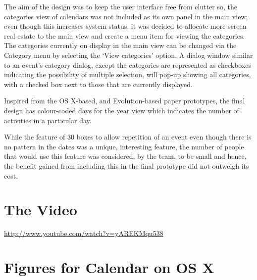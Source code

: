 \documentclass{article}
\begin{document}
The aim of the design was to keep the user interface free from clutter
so, the categories view of calendars was not included as its own panel
in the main view; even though this increases system status, it was
decided to allocate more screen real estate to the main view and create
a menu item for viewing the categories. The categories currently on
display in the main view can be changed via the Category menu by
selecting the `View categories' option. A dialog window similar to
an event's category dialog, except the categories are represented as
checkboxes indicating the possibility of multiple selection, will
pop-up showing all categories, with a checked box next to those that
are currently displayed.

Inspired from the OS X-based, and Evolution-based paper prototypes, the
final design has colour-coded days for the year view which indicates
the number of activities in a particular day.

While the feature of 30 boxes to allow repetition of an event even
though there is no pattern in the dates was a unique, interesting
feature, the number of people that would use this feature was
considered, by the team, to be small and hence, the benefit gained
from including this in the final prototype did not outweigh its cost.


\section{The Video}

\url{http://www.youtube.com/watch?v=yAREKMqu538}

\pagebreak


\appendix

\section{Figures for Calendar on OS X}
\end{document}
